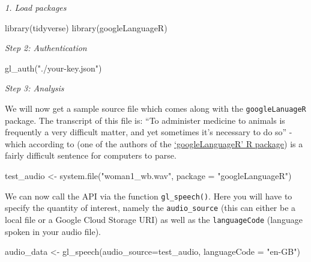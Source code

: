 \documentclass[
]{book}
\newenvironment{Shaded}{\begin{snugshade}}{\end{snugshade}}
\newcommand{\AttributeTok}[1]{\textcolor[rgb]{0.77,0.63,0.00}{#1}}
\newcommand{\FunctionTok}[1]{\textcolor[rgb]{0.00,0.00,0.00}{#1}}
\newcommand{\NormalTok}[1]{#1}
\newcommand{\OtherTok}[1]{\textcolor[rgb]{0.56,0.35,0.01}{#1}}
\newcommand{\StringTok}[1]{\textcolor[rgb]{0.31,0.60,0.02}{#1}}
\begin{document}
\emph{1. Load packages}

\begin{Shaded}
\begin{Highlighting}[]
\FunctionTok{library}\NormalTok{(tidyverse)}
\FunctionTok{library}\NormalTok{(googleLanguageR)}
\end{Highlighting}
\end{Shaded}

\emph{Step 2: Authentication}

\begin{Shaded}
\begin{Highlighting}[]
\FunctionTok{gl\_auth}\NormalTok{(}\StringTok{"./your{-}key.json"}\NormalTok{)}
\end{Highlighting}
\end{Shaded}

\emph{Step 3: Analysis}

We will now get a sample source file which comes along with the \texttt{googleLanuageR} package. The transcript of this file is: ``To administer medicine to animals is frequently a very difficult matter, and yet sometimes it's necessary to do so'' - which according to \citet{Edmondson2017-pv} (one of the authors of the \href{\%22https://cran.r-project.org/web/packages/googleLanguageR/index.html\%22}{`googleLanguageR' R package}) is a fairly difficult sentence for computers to parse.

\begin{Shaded}
\begin{Highlighting}[]
\NormalTok{test\_audio }\OtherTok{\textless{}{-}} \FunctionTok{system.file}\NormalTok{(}\StringTok{"woman1\_wb.wav"}\NormalTok{, }\AttributeTok{package =} \StringTok{"googleLanguageR"}\NormalTok{)}
\end{Highlighting}
\end{Shaded}

We can now call the API via the function \texttt{gl\_speech()}. Here you will have to specify the quantity of interest, namely the \texttt{audio\_source} (this can either be a local file or a Google Cloud Storage URI) as well as the \texttt{languageCode} (language spoken in your audio file).

\begin{Shaded}
\begin{Highlighting}[]
\NormalTok{audio\_data }\OtherTok{\textless{}{-}} \FunctionTok{gl\_speech}\NormalTok{(}\AttributeTok{audio\_source=}\NormalTok{test\_audio, }\AttributeTok{languageCode =} \StringTok{"en{-}GB"}\NormalTok{)}
\end{Highlighting}
\end{Shaded}
\end{document}
